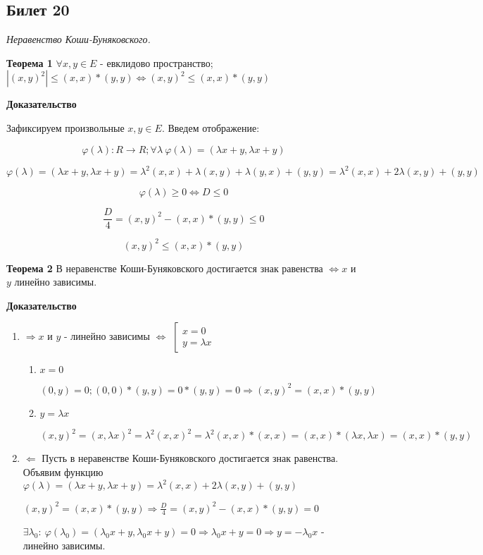 \subsection{Билет 20}

\textit{Неравенство Коши-Буняковского.}

\textbf{Теорема 1} $\forall x,y \in E$ - евклидово пространство; $\left | (x,y)^2 \right| \le  (x,x)*(y,y) \Leftrightarrow (x,y)^2 \le (x,x)*(y,y)$

\textbf{Доказательство}

Зафиксируем произвольные $x,y \in E$. Введем отображение:

$$
  \varphi(\lambda): R \to R; \forall \lambda ~ \varphi (\lambda) = (\lambda x + y,\lambda x + y)  
$$

$$
  \varphi (\lambda) = (\lambda x + y,\lambda x + y) = \lambda^2(x,x) + \lambda(x,y) + \lambda(y,x) + (y,y) = \lambda^2(x,x) + 2\lambda(x,y) + (y,y)
$$

$$
  \varphi (\lambda) \ge 0 \Leftrightarrow D \le 0
$$

$$
  \frac{D}{4} = (x,y)^2 - (x,x)*(y,y) \le 0 
$$

$$
  (x,y)^2 \le (x,x)*(y,y)
$$

\textbf{Теорема 2} В неравенстве Коши-Буняковского достигается знак равенства $\Leftrightarrow x$ и $y$ линейно зависимы.

\textbf{Доказательство}

\begin{enumerate}
 \item $\Rightarrow x$ и $y$ - линейно зависимы $\Leftrightarrow$
	$\left[\begin{matrix} 
	                  \mbox{$x=0$} \\
	                  \mbox{$y= \lambda x$}
	                 \end{matrix}\right.$
      
      \begin{enumerate}
       \item $x=0$
       
	     $(0,y) = 0; (0,0)*(y,y) = 0*(y,y) = 0 \Rightarrow (x,y)^2 = (x,x)*(y,y)$
       \item $y=\lambda x$
       
	     $(x,y)^2 = (x,\lambda x)^2 = \lambda^2 (x,x)^2 = \lambda^2 (x,x)*(x,x) = (x,x)*(\lambda x,\lambda x) = (x,x)*(y,y)$
      \end{enumerate}
 \item $\Leftarrow$ Пусть в неравенстве Коши-Буняковского достигается знак равенства. Объявим функцию $\varphi (\lambda) = (\lambda x + y,\lambda x + y) = \lambda^2(x,x) + 2\lambda(x,y) + (y,y)$ 
       
       $(x,y)^2 = (x,x)*(y,y) \Rightarrow \frac{D}{4} = (x,y)^2 - (x,x)*(y,y) = 0$
       
       $\exists \lambda_0: ~ \varphi(\lambda_0) = (\lambda_0 x + y,\lambda_0 x + y) = 0 \Rightarrow \lambda_0 x + y = 0 \Rightarrow y = - \lambda_0 x$ - линейно зависимы.
\end{enumerate}
